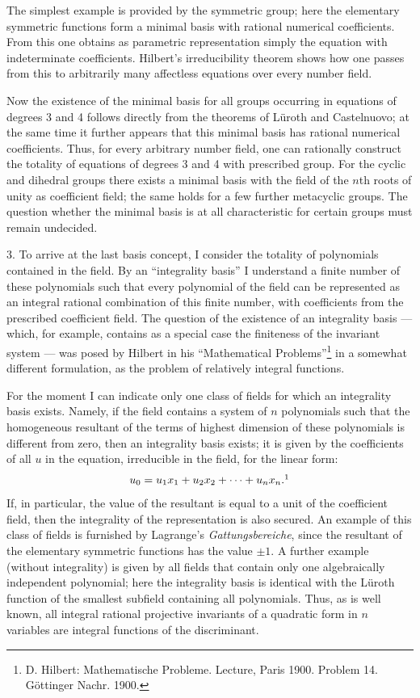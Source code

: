 \documentclass[11pt]{article}
\begin{document}
The simplest example is provided by the symmetric group; here the elementary symmetric functions form a minimal basis with rational numerical coefficients. From this one obtains as parametric representation simply the equation with indeterminate coefficients. Hilbert's irreducibility theorem shows how one passes from this to arbitrarily many affectless equations over every number field.

Now the existence of the minimal basis for all groups occurring in equations of degrees 3 and 4 follows directly from the theorems of Lüroth and Castelnuovo; at the same time it further appears that this minimal basis has rational numerical coefficients. Thus, for every arbitrary number field, one can rationally construct the totality of equations of degrees 3 and 4 with prescribed group. For the cyclic and dihedral groups there exists a minimal basis with the field of the $n$th roots of unity as coefficient field; the same holds for a few further metacyclic groups. The question whether the minimal basis is at all characteristic for certain groups must remain undecided.

3. To arrive at the last basis concept, I consider the totality of polynomials contained in the field. By an ``integrality basis'' I understand a finite number of these polynomials such that every polynomial of the field can be represented as an integral rational combination of this finite number, with coefficients from the prescribed coefficient field. The question of the existence of an integrality basis --- which, for example, contains as a special case the finiteness of the invariant system --- was posed by Hilbert in his ``Mathematical Problems''\footnote{D. Hilbert: Mathematische Probleme. Lecture, Paris 1900. Problem 14. Göttinger Nachr. 1900.} in a somewhat different formulation, as the problem of relatively integral functions.

For the moment I can indicate only one class of fields for which an integrality basis exists. Namely, if the field contains a system of $n$ polynomials such that the homogeneous resultant of the terms of highest dimension of these polynomials is different from zero, then an integrality basis exists; it is given by the coefficients of all $u$ in the equation, irreducible in the field, for the linear form:
\[
  u_0=u_1x_1+u_2x_2+\cdots+u_nx_n.\footnotemark
\]
If, in particular, the value of the resultant is equal to a unit of the coefficient field, then the integrality of the representation is also secured. An example of this class of fields is furnished by Lagrange's \emph{Gattungsbereiche}, since the resultant of the elementary symmetric functions has the value $\pm 1$. A further example (without integrality) is given by all fields that contain only one algebraically independent polynomial; here the integrality basis is identical with the Lüroth function of the smallest subfield containing all polynomials. Thus, as is well known, all integral rational projective invariants of a quadratic form in $n$ variables are integral functions of the discriminant.
\end{document}
